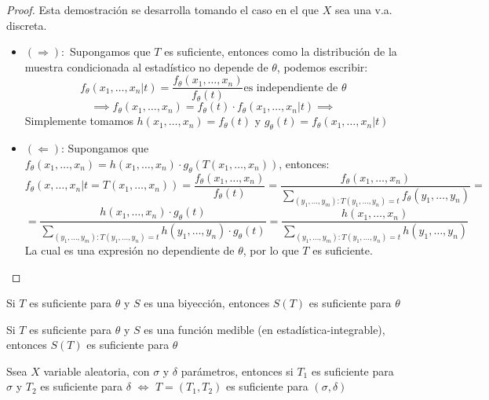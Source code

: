   
  \begin{proof}
    Esta demostración se desarrolla tomando el caso en el que $X$ sea una v.a. discreta. 
    \begin{itemize}
      \item $(\Rightarrow):$ Supongamos que $T$ es suficiente, entonces como la distribución de la muestra condicionada al estadístico no depende de $\theta$, podemos escribir:
      $$ f_{\theta}(x_1, \ldots, x_n | t) = \frac{f_{\theta}(x_1, \ldots, x_n)}{f_{\theta}(t)} \text{es independiente de } \theta$$
      $$\implies f_{\theta}(x_1, \ldots, x_n) = f_{\theta}(t) \cdot f_{\theta}(x_1, \ldots, x_n | t) \implies$$
      Simplemente tomamos $h(x_1, \ldots, x_n) = f_{\theta}(t)$ y $g_{\theta}(t) = f_{\theta}(x_1, \ldots, x_n | t)$
      \item $(\Leftarrow)$: Supongamos que $f_{\theta}(x_1, \ldots, x_n) = h(x_1, \ldots, x_n) \cdot g_{\theta}(T(x_1, \ldots, x_n))$, entonces:\\
      $$ f_{\theta}(x, \ldots, x_n | t = T(x_1, \ldots, x_n)) = \frac{f_{\theta}(x_1, \ldots, x_n)}{f_{\theta}(t)} = \frac{f_{\theta}(x_1, \ldots, x_n)}{\sum_{(y_1, \ldots, y_m) : T(y_1, \ldots, y_n) = t} f_{\theta}(y_1, \ldots, y_n)} = $$ $$ = \frac{h(x_1, \ldots, x_n) \cdot g_{\theta}(t)}{\sum_{(y_1, \ldots, y_m) : T(y_1, \ldots, y_n) = t} h(y_1, \ldots, y_n) \cdot g_{\theta}(t)} = \frac{h(x_1, \ldots, x_n)}{\sum_{(y_1, \ldots, y_m) : T(y_1, \ldots, y_n) = t} h(y_1, \ldots, y_n)}$$ La cual es una expresión no dependiente de $\theta$, por lo que $T$ es suficiente.
    \end{itemize}
  \end{proof}

  \begin{proposición}
    Si $T$ es suficiente para $\theta$ y $S$ es una biyección, entonces $S(T)$ es suficiente para $\theta$
  \end{proposición}

  \begin{proposición}
    Si $T$ es suficiente para $\theta$ y $S$ es una función medible (en estadística-integrable), entonces $S(T)$ es suficiente para $\theta$
  \end{proposición}

  \begin{proposición}
    Ssea $X$ variable aleatoria, con $\sigma$ y $\delta$ parámetros, entonces si $T_1$ es suficiente para $\sigma$ y $T_2$ es suficiente para $\delta$ $\iff$ $T = (T_1, T_2)$ es suficiente para $(\sigma, \delta)$
  \end{proposición}

